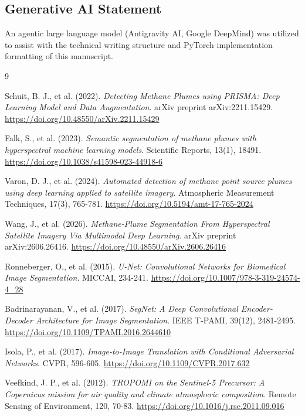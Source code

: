 \documentclass[final,3p,times,twocolumn]{elsarticle}
\begin{document}
\subsection*{Generative AI Statement}
An agentic large language model (Antigravity AI, Google DeepMind) was utilized to assist with the technical writing structure and PyTorch implementation formatting of this manuscript.

\begin{thebibliography}{9}

Schuit, B. J., et al. (2022). \textit{Detecting Methane Plumes using PRISMA: Deep Learning Model and Data Augmentation}. arXiv preprint arXiv:2211.15429. \url{https://doi.org/10.48550/arXiv.2211.15429}

Falk, S., et al. (2023). \textit{Semantic segmentation of methane plumes with hyperspectral machine learning models}. Scientific Reports, 13(1), 18491. \url{https://doi.org/10.1038/s41598-023-44918-6}

Varon, D. J., et al. (2024). \textit{Automated detection of methane point source plumes using deep learning applied to satellite imagery}. Atmospheric Measurement Techniques, 17(3), 765-781. \url{https://doi.org/10.5194/amt-17-765-2024}

Wang, J., et al. (2026). \textit{Methane-Plume Segmentation From Hyperspectral Satellite Imagery Via Multimodal Deep Learning}. arXiv preprint arXiv:2606.26416. \url{https://doi.org/10.48550/arXiv.2606.26416}

Ronneberger, O., et al. (2015). \textit{U-Net: Convolutional Networks for Biomedical Image Segmentation}. MICCAI, 234-241. \url{https://doi.org/10.1007/978-3-319-24574-4_28}

Badrinarayanan, V., et al. (2017). \textit{SegNet: A Deep Convolutional Encoder-Decoder Architecture for Image Segmentation}. IEEE T-PAMI, 39(12), 2481-2495. \url{https://doi.org/10.1109/TPAMI.2016.2644610}

Isola, P., et al. (2017). \textit{Image-to-Image Translation with Conditional Adversarial Networks}. CVPR, 596-605. \url{https://doi.org/10.1109/CVPR.2017.632}

Veefkind, J. P., et al. (2012). \textit{TROPOMI on the Sentinel-5 Precursor: A Copernicus mission for air quality and climate atmospheric composition}. Remote Sensing of Environment, 120, 70-83. \url{https://doi.org/10.1016/j.rse.2011.09.016}


\end{thebibliography}
\end{document}
